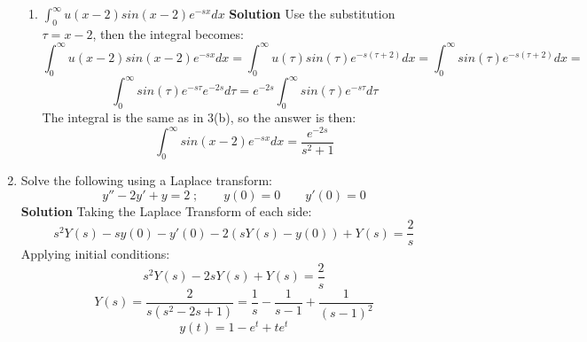 \documentclass[letterpaper, fontsize=11pt]{scrartcl} %
\numberwithin{equation}{section} %
\numberwithin{figure}{section} %
\numberwithin{table}{section} %
\begin{document}
\begin{enumerate}
\begin{enumerate}
\item $\int_{0}^{\infty}u(x-2)sin(x-2)e^{-sx} dx$ \newline
\textbf{Solution} \newline
Use the substitution $\tau = x -2$, then the integral becomes:
$$\int_{0}^{\infty}u(x-2)sin(x-2)e^{-sx} dx = \int_{0}^{\infty}u(\tau)sin(\tau)e^{-s(\tau + 2)}dx = \int_{0}^{\infty}sin(\tau)e^{-s(\tau + 2)}dx = $$ $$\int_{0}^{\infty}sin(\tau)e^{-s\tau}e^{-2s}d\tau = e^{-2s}\int_{0}^{\infty}sin(\tau)e^{-s\tau}d\tau$$
The integral is the same as in 3(b), so the answer is then:
$$\int_{0}^{\infty}sin(x-2)e^{-sx} dx =  \frac{e^{-2s}}{s^2 + 1}$$

\end{enumerate}

\item Solve the following using a Laplace transform: $$y'' - 2y' +y = 2 \; ; \qquad y(0) = 0 \qquad y'(0) = 0$$
\textbf{Solution} \newline
Taking the Laplace Transform of each side:
$$s^2Y(s) -sy(0) - y'(0) -2(sY(s) - y(0)) +Y(s) = \frac{2}{s}$$
Applying initial conditions:
$$s^2Y(s) -2sY(s) + Y(s) = \frac{2}{s}$$
$$Y(s) =  \frac{2}{s(s^2 - 2s +1)} =  \frac{1}{s} - \frac{1}{s-1} + \frac{1}{(s-1)^2}$$
$$y(t) = 1 - e^t + te^t$$


\end{enumerate}

\end{document}
